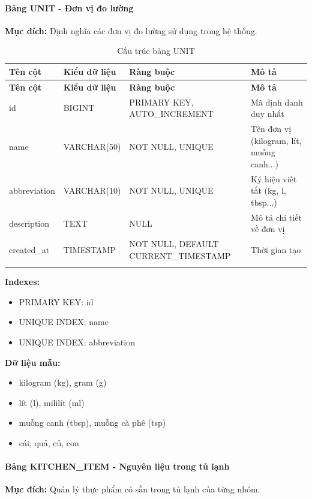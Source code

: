 \paragraph{Bảng UNIT - Đơn vị đo lường}
\textbf{Mục đích:} Định nghĩa các đơn vị đo lường sử dụng trong hệ thống.

\small
\begin{longtable}{|>{\raggedright\arraybackslash}p{3.5cm}|>{\raggedright\arraybackslash}p{3cm}|>{\raggedright\arraybackslash}p{4cm}|>{\raggedright\arraybackslash}p{4cm}|}
\hline
\textbf{Tên cột} & \textbf{Kiểu dữ liệu} & \textbf{Ràng buộc} & \textbf{Mô tả} \\
\hline
\endfirsthead
\hline
\textbf{Tên cột} & \textbf{Kiểu dữ liệu} & \textbf{Ràng buộc} & \textbf{Mô tả} \\
\hline
\endhead
id & BIGINT & PRIMARY KEY, AUTO\_INCREMENT & Mã định danh duy nhất \\
\hline
name & VARCHAR(50) & NOT NULL, UNIQUE & Tên đơn vị (kilogram, lít, muỗng canh...) \\
\hline
abbreviation & VARCHAR(10) & NOT NULL, UNIQUE & Ký hiệu viết tắt (kg, l, tbsp...) \\
\hline
description & TEXT & NULL & Mô tả chi tiết về đơn vị \\
\hline
created\_at & TIMESTAMP & NOT NULL, DEFAULT CURRENT\_TIMESTAMP & Thời gian tạo \\
\hline
\caption{Cấu trúc bảng UNIT}
\end{longtable}

\textbf{Indexes:}
\begin{itemize}
    \item PRIMARY KEY: id
    \item UNIQUE INDEX: name
    \item UNIQUE INDEX: abbreviation
\end{itemize}

\textbf{Dữ liệu mẫu:}
\begin{itemize}
    \item kilogram (kg), gram (g)
    \item lít (l), mililít (ml)
    \item muỗng canh (tbsp), muỗng cà phê (tsp)
    \item cái, quả, củ, con
\end{itemize}

\paragraph{Bảng KITCHEN\_ITEM - Nguyên liệu trong tủ lạnh}
\textbf{Mục đích:} Quản lý thực phẩm có sẵn trong tủ lạnh của từng nhóm.

